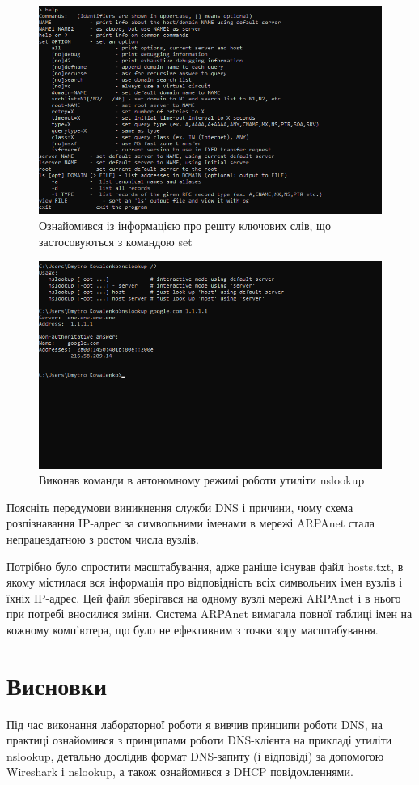 \documentclass{article}
\begin{document}
\begin{normalsize}
\begin{figure}[H]
\end{figure}
\begin{figure}[H]
	\centering
	\includegraphics[width=\textwidth]{7}
	\caption{Ознайомився із інформацією про решту ключових слів, що застосовуються з командою set}
\end{figure}
\begin{figure}[H]
	\centering
	\includegraphics[width=\textwidth]{8}
	\caption{Виконав команди в автономному режимі роботи утиліти nslookup}
\end{figure}

Поясніть передумови виникнення служби DNS і причини, чому схема
розпізнавання IP-адрес за символьними іменами в мережі ARPAnet стала
непрацездатною з ростом числа вузлів.
 
Потрібно було спростити масштабування, адже раніше існував файл hosts.txt, в якому містилася вся інформація про відповідність всіх символьних імен вузлів і їхніх IP-адрес. Цей файл зберігався на одному вузлі мережі ARPAnet і в нього при потребі вносилися зміни. Система ARPAnet вимагала повної таблиці імен на кожному комп'ютера, що було не ефективним з точки зору масштабування.


\section*{Висновки}
Під час виконання лабораторної роботи я вивчив принципи роботи DNS, на практиці ознайомився з принципами роботи DNS-клієнта на прикладі утиліти nslookup, детально дослідив формат DNS-запиту (і відповіді) за допомогою Wireshark і nslookup, а також ознайомився з DHCP повідомленнями.
	    
\end{normalsize}
\end{document}
